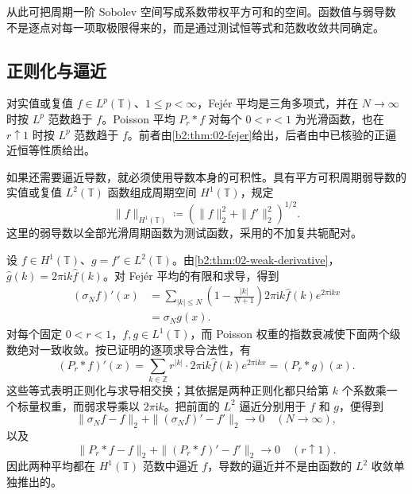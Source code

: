 \ProseParagraphBreak

从此可把周期一阶 Sobolev 空间写成系数带权平方可和的空间。函数值与弱导数不是逐点对每一项取极限得来的，而是通过测试恒等式和范数收敛共同确定。

\subsection{正则化与逼近}
\label{b2:subsec:020604}

对实值或复值 \(f\in L^p(\mathbb T)\)、\(1\leq p<\infty\)，Fejér 平均是三角多项式，并在 \(N\to\infty\) 时按 \(L^p\) 范数趋于 \(f\)。Poisson 平均 \(P_r*f\) 对每个 \(0<r<1\) 为光滑函数，也在 \(r\uparrow1\) 时按 \(L^p\) 范数趋于 \(f\)。前者由\cref{b2:thm:02-fejer}给出，后者由中已核验的正逼近恒等性质给出。

\ProseParagraphBreak

如果还需要逼近导数，就必须使用导数本身的可积性。具有平方可积周期弱导数的实值或复值 \(L^2(\mathbb T)\) 函数组成周期空间 \(H^1(\mathbb T)\)，规定
\[
 \|f\|_{H^1(\mathbb T)}
 \coloneqq\left(\|f\|_2^2+\|f'\|_2^2\right)^{1/2}.
\]
这里的弱导数以全部光滑周期函数为测试函数，采用的不加复共轭配对。

\ProseParagraphBreak

设 \(f\in H^1(\mathbb T)\)、\(g=f'\in L^2(\mathbb T)\)。由\cref{b2:thm:02-weak-derivative}，\(\widehat g(k)=2\pi\mathrm i k\widehat f(k)\)。对 Fejér 平均的有限和求导，得到
\[
 \begin{aligned}
 (\sigma_Nf)'(x)
 &=\sum_{|k|\leq N}\left(1-\frac{|k|}{N+1}\right)
      2\pi\mathrm i k\widehat f(k)e^{2\pi\mathrm i kx}\\
 &=\sigma_Ng(x).
 \end{aligned}
\]
对每个固定 \(0<r<1\)，\(f,g\in L^1(\mathbb T)\)，而 Poisson 权重的指数衰减使下面两个级数绝对一致收敛。按已证明的逐项求导合法性，有
\[
 (P_r*f)'(x)
 =\sum_{k\in\mathbb Z}r^{|k|}\cdot2\pi\mathrm i k\widehat f(k)e^{2\pi\mathrm i kx}
 =(P_r*g)(x).
\]
这些等式表明正则化与求导相交换；其依据是两种正则化都只给第 \(k\) 个系数乘一个标量权重，而弱求导乘以 \(2\pi\mathrm i k\)。把前面的 \(L^2\) 逼近分别用于 \(f\) 和 \(g\)，便得到
\[
 \|\sigma_Nf-f\|_2+\|(\sigma_Nf)'-f'\|_2
 \longrightarrow0\quad(N\to\infty),
\]
以及
\[
 \|P_r*f-f\|_2+\|(P_r*f)'-f'\|_2
 \longrightarrow0\quad(r\uparrow1).
\]
因此两种平均都在 \(H^1(\mathbb T)\) 范数中逼近 \(f\)，导数的逼近并不是由函数的 \(L^2\) 收敛单独推出的。

